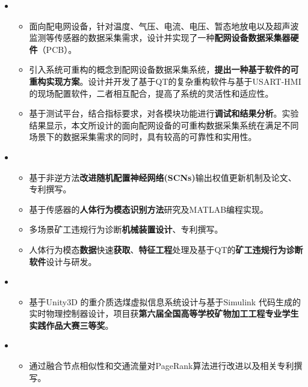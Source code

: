   \begin{itemize}[leftmargin=*]

      \item
      {\small
      	\begin{itemize}
      	\item 面向配电网设备，针对温度、气压、电流、电压、暂态地放电以及超声波监测等传感器的数据采集需求，设计并实现了一种\textbf{配网设备数据采集器硬件}（PCB）。
            \item 引入系统可重构的概念到配网设备数据采集系统，\textbf{提出一种基于软件的可重构实现方案}。设计并开发了基于QT的复杂重构软件与基于USART-HMI的现场配置软件，二者相互配合，提高了系统的灵活性和适应性。
            \item 基于测试平台，结合指标要求，对各模块功能进行\textbf{调试和结果分析}。实验结果显示，本文所设计的面向配网设备的可重构数据采集系统在满足不同场景下的数据采集需求的同时，具有较高的可靠性和实用性。
      	\end{itemize}
      }


      \item
      {\small
      	\begin{itemize}
      	\item 基于非逆方法\textbf{改进随机配置神经网络(SCNs)}输出权值更新机制及论文、专利撰写。
            \item 基于传感器的\textbf{人体行为模态识别方法}研究及MATLAB编程实现。
            \item 多场景矿工违规行为诊断\textbf{机械装置设计}、专利撰写。
            \item 人体行为模态\textbf{数据}快速\textbf{获取}、\textbf{特征工程}处理及基于QT的\textbf{矿工违规行为诊断软件}设计与研发。
      	\end{itemize}
      }
  
      \item
  {\small
  	\begin{itemize}
  		\item 基于Unity3D 的重介质选煤虚拟信息系统设计与基于Simulink 代码生成的实时物理控制器设计，项目获\textbf{第六届全国高等学校矿物加工工程专业学生实践作品大赛三等奖}。
  	\end{itemize}
  }
  
  \item
  {\small
  	\begin{itemize}
  		\item 通过融合节点相似性和交通流量对PageRank算法进行改进以及相关专利撰写。
  	\end{itemize}
  }


  
  \end{itemize}




